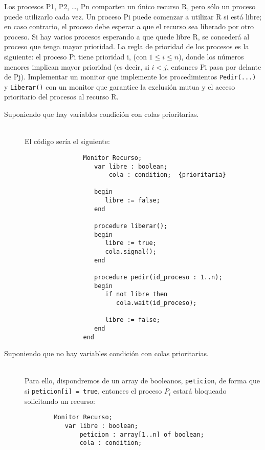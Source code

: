 \begin{ejercicio}
    Los procesos P1, P2, \ldots, Pn comparten un único recurso R, pero sólo un proceso puede utilizarlo cada vez. Un proceso Pi puede comenzar a utilizar R si está libre; en caso contrario, el proceso debe esperar a que el recurso sea liberado por otro proceso. Si hay varios procesos esperando a que quede libre R, se concederá al proceso que tenga mayor prioridad. La regla de prioridad de los procesos es la siguiente: el proceso Pi tiene prioridad i, (con $1 \leq i \leq n$), donde los números menores implican mayor prioridad (es decir, si $i < j$, entonces Pi pasa por delante de Pj). Implementar un monitor que implemente los procedimientos \verb|Pedir(...)| y \verb|Liberar()| con un monitor que garantice la exclusión mutua y el acceso prioritario del procesos al recurso R.\\

    \begin{description}
        \item [Suponiendo que hay variables condición con colas prioritarias.]~\\
            El código sería el siguiente:
            \begin{verbatim}
                Monitor Recurso;
                   var libre : boolean;
                       cola : condition;  {prioritaria}
                   
                   begin
                      libre := false;
                   end

                   procedure liberar();
                   begin
                      libre := true;
                      cola.signal();
                   end

                   procedure pedir(id_proceso : 1..n);
                   begin
                      if not libre then
                         cola.wait(id_proceso);

                      libre := false;
                   end
                end
            \end{verbatim}
        \item [Suponiendo que no hay variables condición con colas prioritarias.]~\\
    Para ello, dispondremos de un array de booleanos, \verb|peticion|, de forma que si \verb|peticion[i] = true|, entonces el proceso $P_i$ estará bloqueado solicitando un recurso:
    \begin{verbatim}
        Monitor Recurso;
           var libre : boolean;
               peticion : array[1..n] of boolean;
               cola : condition;


\end{verbatim}
\end{description}
\end{ejercicio}
